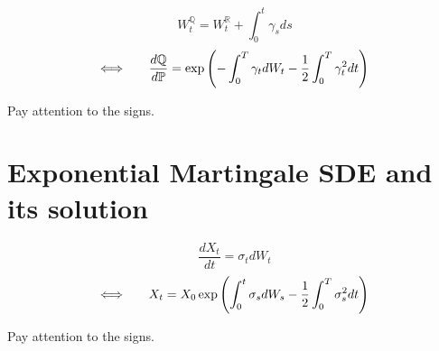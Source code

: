 \documentclass[uplatex]{jsarticle}
\begin{document}
\[
	W^{\mathbb{Q}}_{t} = W^{\mathbb{R}}_{t} + \int^{t}_{0} \gamma_{s} ds
\]
\[
	\Longleftrightarrow
	\ \hspace{5mm}
	\frac{d \mathbb{Q}}{d \mathbb{P}}
	=
	\exp \left( - \int^{T}_{0} \gamma_{t} dW_{t} - \frac{1}{2} \int^{T}_{0} \gamma_{t}^{2} dt \right)
\]

Pay attention to the signs.


\section{Exponential Martingale SDE and its solution}

\[
	\frac{d X_{t}}{ dt}
	=
	\sigma_{t} d W_{t}
\]
\[
	\Longleftrightarrow
	\ \hspace{5mm}
	X_{t}
	=
	X_{0}
	\exp \left( \int^{t}_{0} \sigma_{s} dW_{s} - \frac{1}{2} \int^{T}_{0} \sigma_{s}^{2} dt \right)
\]

Pay attention to the signs.
\end{document}
